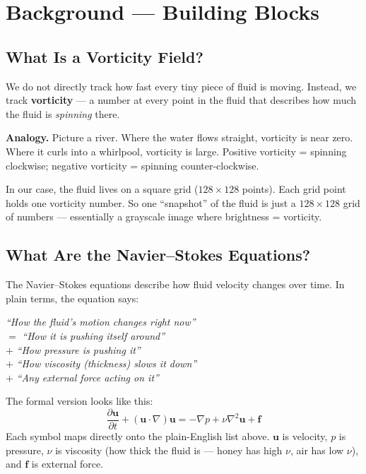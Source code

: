 \documentclass[acmsmall,nonacm]{acmart}
\begin{document}
\section{Background --- Building Blocks}
\label{sec:background}

\subsection{What Is a Vorticity Field?}

We do not directly track how fast every tiny piece of fluid is moving.
Instead, we track \textbf{vorticity} --- a number at every point in the fluid
that describes how much the fluid is \emph{spinning} there.

\begin{analogybox}
\textbf{Analogy.}
Picture a river.
Where the water flows straight, vorticity is near zero.
Where it curls into a whirlpool, vorticity is large.
Positive vorticity = spinning clockwise;
negative vorticity = spinning counter-clockwise.
\end{analogybox}

In our case, the fluid lives on a square grid ($128 \times 128$ points).
Each grid point holds one vorticity number.
So one ``snapshot'' of the fluid is just a $128 \times 128$ grid of numbers ---
essentially a grayscale image where brightness = vorticity.

\subsection{What Are the Navier--Stokes Equations?}

The Navier--Stokes equations describe how fluid velocity changes over time.
In plain terms, the equation says:

\begin{center}
\emph{``How the fluid's motion changes right now''} \\[2pt]
$=$ \emph{``How it is pushing itself around''} \\[2pt]
$+$ \emph{``How pressure is pushing it''} \\[2pt]
$+$ \emph{``How viscosity (thickness) slows it down''} \\[2pt]
$+$ \emph{``Any external force acting on it''}
\end{center}

The formal version looks like this:
\[
  \frac{\partial \mathbf{u}}{\partial t} + (\mathbf{u} \cdot \nabla)\mathbf{u}
  = -\nabla p + \nu \nabla^2 \mathbf{u} + \mathbf{f}
\]
Each symbol maps directly onto the plain-English list above.
$\mathbf{u}$ is velocity, $p$ is pressure, $\nu$ is viscosity (how thick the
fluid is --- honey has high $\nu$, air has low $\nu$), and $\mathbf{f}$ is
external force.
\end{document}

